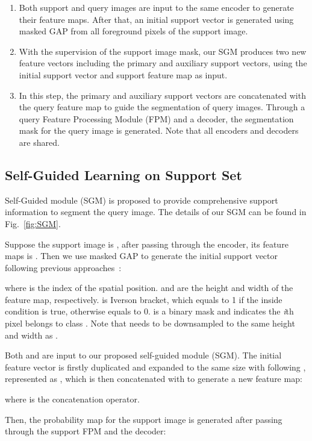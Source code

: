 \documentclass[final]{cvpr}
\begin{document}
\begin{enumerate}[1)]
	\item Both support and query images are input to the same encoder to generate their feature maps. After that, an initial support vector is generated using masked GAP from all foreground pixels of the support image. 
	\item With the supervision of the support image mask, our SGM produces two new feature vectors including the primary and auxiliary support vectors,  using the initial support vector and support feature map as input. 
	\item In this step, the primary and auxiliary support vectors are concatenated with the query feature map to guide the segmentation of query images. Through a query Feature Processing Module (FPM) and a decoder, the segmentation mask for the query image is generated. Note that all encoders and decoders are shared. 
\end{enumerate}	


\subsection{Self-Guided Learning on Support Set}\label{sec:SGM}
Self-Guided module (SGM) is proposed to provide comprehensive support information to segment the query image. The details of our SGM can be found in Fig.~\ref{fig:SGM}.

Suppose the support image is , after passing through the encoder, its feature maps is . Then we use masked GAP to generate the initial support vector following previous approaches~\cite{zhang2019canet,zhang2020sg,zhu2020self}: 

where  is the index of the spatial position.  and  are the height and width of the feature map, respectively.  is Iverson bracket, which equals to 1 if the inside condition is true, otherwise equals to 0.  is a binary mask and  indicates the \emph{i}th pixel belongs to class . Note that  needs to be downsampled to the same height and width as .  

Both  and  are input to our proposed self-guided module (SGM). The initial feature vector  is firstly duplicated and expanded to the same size with  following \cite{tian2020prior,zhang2019canet}, represented as , which is then concatenated with  to generate a new feature map:

where  is the concatenation operator.

Then, the probability map for the support image is generated after passing through the support FPM and the decoder:
 
\end{document}
